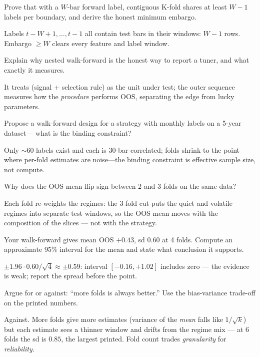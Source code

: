 \begin{exercise}[hard]
Prove that with a $W$-bar forward label, contiguous K-fold shares at least $W-1$
labels per boundary, and derive the honest minimum embargo.
\end{exercise}
\begin{solution}
Labels $t{-}W{+}1,\ldots,t{-}1$ all contain test bars in their windows: $W{-}1$ rows.
Embargo $\ge W$ clears every feature and label window.
\end{solution}

\begin{exercise}[hard]
Explain why nested walk-forward is the honest way to report a tuner, and what exactly it
measures.
\end{exercise}
\begin{solution}
It treats (signal + selection rule) as the unit under test; the outer sequence measures
how the \emph{procedure} performs OOS, separating the edge from lucky parameters.
\end{solution}

\begin{exercise}[hard]
Propose a walk-forward design for a strategy with monthly labels on a 5-year dataset---
what is the binding constraint?
\end{exercise}
\begin{solution}
Only $\sim$60 labels exist and each is 30-bar-correlated; folds shrink to the point where
per-fold estimates are noise---the binding constraint is effective sample size, not
compute.
\end{solution}

\begin{exercise}[easy]
Why does the OOS mean flip sign between 2 and 3 folds on the same
data?
\end{exercise}
\begin{solution}
Each fold re-weights the regimes: the 3-fold cut puts the quiet
and volatile regimes into separate test windows, so the OOS mean
moves with the composition of the slices --- not with the
strategy.
\end{solution}
\begin{exercise}[medium]
Your walk-forward gives mean OOS $+0.43$, sd $0.60$ at 4 folds.
Compute an approximate 95\% interval for the mean and state what
conclusion it supports.
\end{exercise}
\begin{solution}
$\pm 1.96\cdot0.60/\sqrt4 \approx \pm0.59$: interval
$[-0.16, +1.02]$ includes zero --- the evidence is weak; report
the spread before the point.
\end{solution}
\begin{exercise}[hard]
Argue for or against: ``more folds is always better.'' Use the
bias-variance trade-off on the printed numbers.
\end{exercise}
\begin{solution}
Against. More folds give more estimates (variance of the
\emph{mean} falls like $1/\sqrt{k}$) but each estimate sees a
thinner window and drifts from the regime mix --- at 6 folds the
sd is $0.85$, the largest printed. Fold count trades
\emph{granularity} for \emph{reliability}.
\end{solution}

